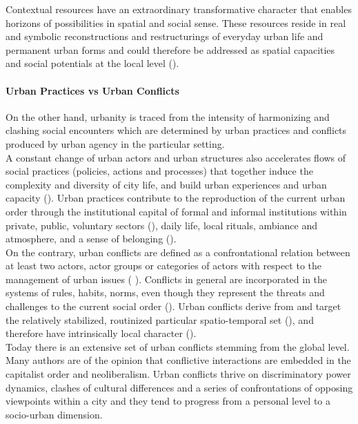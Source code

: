 \documentclass[11pt]{report}
\begin{document}
{{{Contextual resources have an extraordinary transformative character that enables horizons of possibilities in spatial and social sense.
These resources reside in real and symbolic reconstructions and restructurings of everyday urban life and permanent urban forms and could therefore be addressed as spatial capacities and social potentials at the local level (\href{Swyngedouw}{\citealt{swyngedouw_glocal_2003}}).

\paragraph{Urban Practices vs Urban Conflicts}

On the other hand, urbanity is traced from the intensity of harmonizing and clashing social encounters which are determined by urban practices and conflicts produced by urban agency in the particular setting. 
\\

A constant change of urban actors and urban structures also accelerates flows of social practices (policies, actions and processes) that together induce the complexity and diversity of city life, and build urban experiences and urban capacity (\href{Robinson}{\citealt{robinson_ordinary_2006}}).
Urban practices contribute to the reproduction of the current urban order through the institutional capital of formal and informal institutions within private, public, voluntary sectors (\href{Vujosevic}{\citealt{vujosevic_regionalizam_2015}}), daily life, local rituals, ambiance and atmosphere, and a sense of belonging (\href{ref}{\citealt{volic_belgrade_2012}}).
\\

On the contrary, urban conflicts are defined as a confrontational relation between at least two actors, actor groups or categories of actors with respect to the management of urban issues (\href{ref}{\citealt{aznar_quels_2006}} {\href{ref}{\citealt{renau_nimbysm_2016}}).
Conflicts in general are incorporated in the systems of rules, habits, norms, even though they represent the threats and challenges to the current social order (\citealt{sears_good_2005}).
Urban conflicts derive from and target the relatively stabilized, routinized particular spatio-temporal set (\citealt{Brenner and Theodore 2005}), and therefore have intrinsically local character (\href{Sassen}{\citealt{sassen_toward_2007}}).
\\

Today there is an extensive set of urban conflicts stemming from the global level.
Many authors are of the opinion that conflictive interactions are embedded in the capitalist order and neoliberalism.
Urban conflicts thrive on discriminatory power dynamics, clashes of cultural differences and a series of confrontations of opposing viewpoints within a city and they tend to progress from a personal level to a socio-urban dimension.
\\

}}}}
\end{document}
